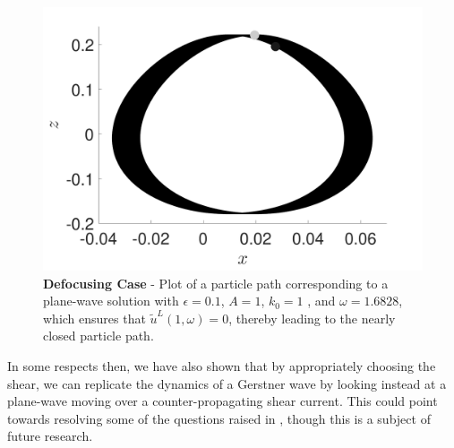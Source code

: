 \documentclass{JFM_Style/jfm}
\begin{document}
\begin{figure}
\centering
\includegraphics[width=.48\textwidth]{om_val_1pt7_k0_1_ep_pt1_defoc_ztrack_pwave}
\caption{\small {\bf Defocusing Case} - Plot of a particle path corresponding to a plane-wave solution with $\epsilon=0.1$, $A=1$, $k_{0}=1$ , and $\omega=1.6828$, which ensures that $\tilde{u}^{L}(1,\omega)=0$, thereby leading to the nearly closed particle path.}
\label{fig:pwavezdrift}
\end{figure}  

In some respects then, we have also shown that by appropriately choosing the shear, we can replicate the dynamics of a Gerstner wave \cite{constantin} by looking instead at a plane-wave moving over a counter-propagating shear current.  This could point towards resolving some of the questions raised in \cite{monismith,smith}, though this is a subject of future research.  
\end{document}
